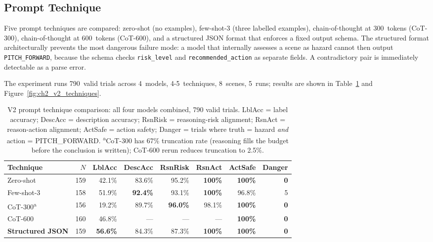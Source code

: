 \subsection{Prompt Technique}
\label{sec:ch2_v2}

Five prompt techniques are compared: zero-shot (no examples), few-shot-3 (three labelled examples), chain-of-thought at 300~tokens (CoT-300), chain-of-thought at 600~tokens (CoT-600), and a structured JSON format that enforces a fixed output schema. 
The structured format architecturally prevents the most dangerous failure mode: a model that internally assesses a scene as
hazard cannot then output \texttt{PITCH\_FORWARD}, because the schema checks \texttt{risk\_level} and \texttt{recommended\_action} as separate fields. 
A contradictory pair is immediately detectable as a parse error.

The experiment runs 790~valid trials across 4~models, 4-5~techniques, 8~scenes, 5~runs; results are shown in
Table~\ref{tab:ch2_v2_technique} and Figure~\ref{fig:ch2_v2_techniques}.

\begin{table}[ht]
  \caption{V2 prompt technique comparison: all four models combined, 790 valid
    trials. LblAcc = label accuracy; DescAcc = description accuracy; RsnRisk =
    reasoning-risk alignment; RsnAct = reason-action alignment; ActSafe = action
    safety; Danger = trials where truth = hazard \emph{and} action = PITCH\_FORWARD.
    \textsuperscript{a}CoT-300 has 67\% truncation rate (reasoning fills the
    budget before the conclusion is written); CoT-600 rerun reduces truncation
    to 2.5\%.}
  \label{tab:ch2_v2_technique}
  \centering
  \small
  \begin{tabular}{lrrrrrrr}
    \toprule
    Technique & $N$ & LblAcc & DescAcc & RsnRisk & RsnAct & ActSafe & Danger \\
    \midrule
    Zero-shot       & 159 & 42.1\% & 83.6\% & 95.2\% & \textbf{100\%} & \textbf{100\%} & \textbf{0} \\
    Few-shot-3      & 158 & 51.9\% & \textbf{92.4\%} & 93.1\% & \textbf{100\%} & 96.8\%  & 5 \\
    CoT-300\textsuperscript{a} & 156 & 19.2\% & 89.7\% & \textbf{96.0\%} & 98.1\% & \textbf{100\%} & \textbf{0} \\
    CoT-600         & 160 & 46.8\% & --- & --- & --- & \textbf{100\%} & \textbf{0} \\
    \textbf{Structured JSON} & 159 & \textbf{56.6\%} & 84.3\% & 87.3\% & \textbf{100\%} & \textbf{100\%} & \textbf{0} \\
    \bottomrule
  \end{tabular}
\end{table}

